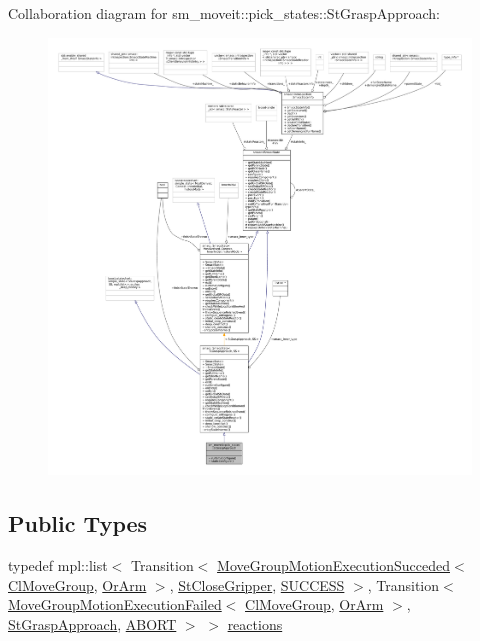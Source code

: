 Collaboration diagram for sm\+\_\+moveit\+:\+:pick\+\_\+states\+:\+:St\+Grasp\+Approach\+:
\nopagebreak
\begin{figure}[H]
\begin{center}
\leavevmode
\includegraphics[width=350pt]{structsm__moveit_1_1pick__states_1_1StGraspApproach__coll__graph}
\end{center}
\end{figure}
\subsection*{Public Types}
\begin{DoxyCompactItemize}
\item 
typedef mpl\+::list$<$ Transition$<$ \hyperlink{structmoveit__z__client_1_1MoveGroupMotionExecutionSucceded}{Move\+Group\+Motion\+Execution\+Succeded}$<$ \hyperlink{classmoveit__z__client_1_1ClMoveGroup}{Cl\+Move\+Group}, \hyperlink{classsm__moveit_1_1OrArm}{Or\+Arm} $>$, \hyperlink{structsm__moveit_1_1pick__states_1_1StCloseGripper}{St\+Close\+Gripper}, \hyperlink{classSUCCESS}{S\+U\+C\+C\+E\+SS} $>$, Transition$<$ \hyperlink{structmoveit__z__client_1_1MoveGroupMotionExecutionFailed}{Move\+Group\+Motion\+Execution\+Failed}$<$ \hyperlink{classmoveit__z__client_1_1ClMoveGroup}{Cl\+Move\+Group}, \hyperlink{classsm__moveit_1_1OrArm}{Or\+Arm} $>$, \hyperlink{structsm__moveit_1_1pick__states_1_1StGraspApproach}{St\+Grasp\+Approach}, \hyperlink{classABORT}{A\+B\+O\+RT} $>$ $>$ \hyperlink{structsm__moveit_1_1pick__states_1_1StGraspApproach_a459914092dd4d74c25550ca4438a3ff4}{reactions}
\end{DoxyCompactItemize}
